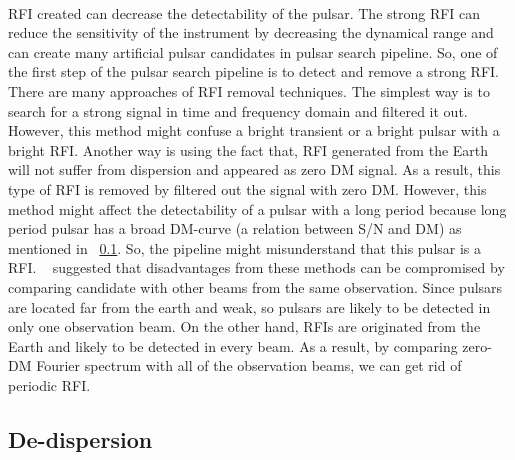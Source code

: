 \documentclass[thesis_msc.tex]{subfiles}
\begin{document}
        \paragraph{} RFI created can decrease the detectability of the pulsar. The strong RFI can reduce the sensitivity of the instrument by decreasing the dynamical range and can create many artificial pulsar candidates in pulsar search pipeline. So, one of the first step of the pulsar search pipeline is to detect and remove a strong RFI. 
        There are many approaches of RFI removal techniques. The simplest way is to search for a strong signal in time and frequency domain and filtered it out. However, this method might confuse a bright transient or a bright pulsar with a bright RFI. Another way is using the fact that, RFI generated from the Earth will not suffer from dispersion and appeared as zero DM signal. As a result, this type of RFI is removed by filtered out the signal with zero DM. However, this method might affect the detectability of a pulsar with a long period because long period pulsar has a broad DM-curve (a relation between S/N and DM) as mentioned in ~\ref{DDM}. So, the pipeline might misunderstand that this pulsar is a RFI. ~\cite{Ng} suggested that disadvantages from these methods can be compromised by comparing candidate with other beams from the same observation. Since pulsars are located far from the earth and weak, so pulsars are likely to be detected in only one observation beam. On the other hand, RFIs are originated from the Earth and likely to be detected in every beam. As a result, by comparing zero-DM Fourier spectrum with all of the observation beams, we can get rid of periodic RFI.     
        
        \subsection{De-dispersion} \label{DDM}
\end{document}
